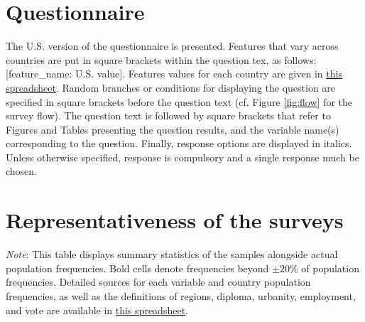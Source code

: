 

\renewcommand{\theenumi}{\arabic{enumi}}
\clearpage
\section{Questionnaire}\label{app:questionnaire}
The U.S. version of the questionnaire is presented. Features that vary across countries are put in square brackets within the question tex, as follows: [feature\_name: U.S. value]. Features values for each country are given in \href{https://github.com/bixiou/robustness_global_redistr/raw/main/questionnaire/sources.xlsx}{this spreadsheet}. 
Random branches or conditions for displaying the question are specified in square brackets before the question text (cf. Figure \ref{fig:flow} for the survey flow). The question text is followed by square brackets that refer to Figures and Tables presenting the question results, and the variable name(s) corresponding to the question. Finally, response options are displayed in italics. 
Unless otherwise specified, response is compulsory and a single response much be chosen.



\clearpage
\section{Representativeness of the surveys}\label{app:representativeness}

\begin{table}[h!]
    \caption[Sample representativeness in All, Eu, EU]{Sample representativeness overall, in Europe, and in the European Union. %
    } \label{tab:representativeness_0}
    \makebox[\textwidth][c]{
        \resizebox*{!}{.73\textheight}{%
        
        }
    }
    {\footnotesize \textit{Note}: This table displays summary statistics of the samples alongside actual population frequencies. Bold cells denote frequencies beyond $\pm 20\%$ of population frequencies. 
    Detailed sources for each variable and country population frequencies, as well as the definitions of regions, diploma, urbanity, employment, and vote are available in \href{https://github.com/bixiou/robustness_global_redistr/raw/main/questionnaire/sources.xlsx}{this spreadsheet}. 
    } 
\end{table}

